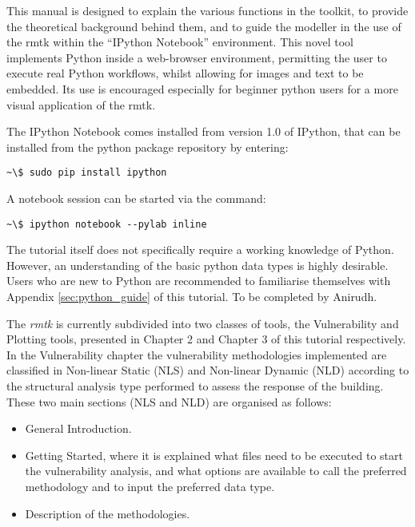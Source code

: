 This manual is designed to explain the various functions in the toolkit, to provide the theoretical background behind them, and to guide the modeller in the use of the rmtk within the ``IPython Notebook'' environment. This novel tool implements Python inside a web-browser environment, permitting the user to execute real Python workflows, whilst allowing for images and text to be embedded. Its use is encouraged especially for beginner python users for a more visual application of the rmtk.

The IPython Notebook  comes installed from version 1.0 of IPython, that can be installed from the python package repository by entering: 

\begin{Verbatim}[frame=single, commandchars=\\\{\}, samepage=true]
~\$ sudo pip install ipython
\end{Verbatim}

A notebook session can be started via the command:

\begin{Verbatim}[frame=single, commandchars=\\\{\}, samepage=true]
~\$ ipython notebook --pylab inline
\end{Verbatim}

The tutorial itself does not specifically require a working knowledge of Python. However, an understanding of the basic python data types is highly desirable. Users who are new to Python are recommended to familiarise themselves with Appendix \ref{sec:python_guide} of this tutorial. 
To be completed by Anirudh.

The \textit{rmtk} is currently subdivided into two classes of tools, the Vulnerability and Plotting tools, presented in Chapter 2 and Chapter 3 of this tutorial respectively. In the Vulnerability chapter the vulnerability methodologies implemented are classified in Non-linear Static (NLS) and Non-linear Dynamic (NLD) according to the structural analysis type performed to assess the response of the building. These two main sections (NLS and NLD) are organised as follows:

\begin{itemize}
\item General Introduction.
\item Getting Started, where it is explained what files need to be executed to start the vulnerability analysis, and what options are available to call the preferred methodology and to input the preferred data type.
\item Description of the methodologies.
\end{itemize}


